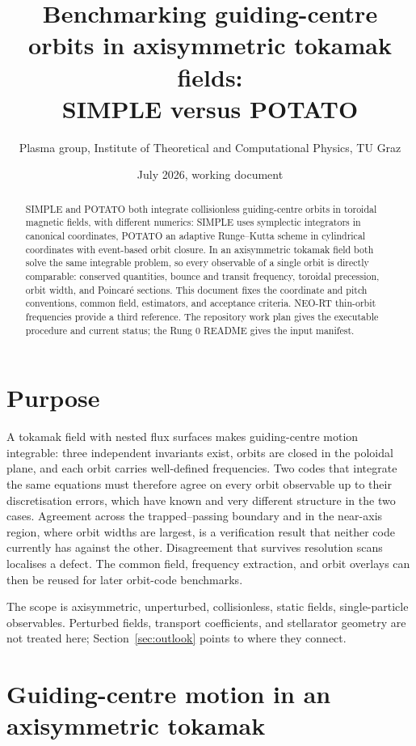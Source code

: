 \documentclass[11pt,a4paper]{article}
\title{Benchmarking guiding-centre orbits in axisymmetric tokamak fields:\\
SIMPLE versus POTATO}
\author{Plasma group, Institute of Theoretical and Computational Physics,
TU Graz}
\date{July 2026, working document}
\begin{document}
\maketitle

\begin{abstract}
SIMPLE and POTATO both integrate collisionless guiding-centre orbits in
toroidal magnetic fields, with different numerics: SIMPLE uses symplectic
integrators in canonical coordinates, POTATO an adaptive
Runge--Kutta scheme in cylindrical coordinates with event-based orbit closure.
In an axisymmetric tokamak field both solve the same integrable problem, so
every observable of a single orbit is directly comparable: conserved
quantities, bounce and transit frequency, toroidal precession, orbit width,
and Poincar\'e sections. This document fixes the coordinate and pitch
conventions, common field, estimators, and acceptance criteria. NEO-RT
thin-orbit frequencies provide a third reference. The repository work plan
gives the executable procedure and current status; the Rung 0 README gives the
input manifest.
\end{abstract}

\section{Purpose}

A tokamak field with nested flux surfaces makes guiding-centre motion
integrable: three independent invariants exist, orbits are closed in the
poloidal plane, and each orbit carries well-defined frequencies. Two codes
that integrate the same equations must therefore agree on every orbit
observable up to their discretisation errors, which have known and very
different structure in the two cases. Agreement across the trapped--passing
boundary and in the near-axis region, where orbit widths are largest, is a
verification result that neither code currently has against the other.
Disagreement that survives resolution scans localises a defect. The common
field, frequency extraction, and orbit overlays can then be reused for later
orbit-code benchmarks.

The scope is axisymmetric, unperturbed,
collisionless, static fields, single-particle observables. Perturbed fields,
transport coefficients, and stellarator geometry are not treated here;
Section~\ref{sec:outlook} points to where they connect.

\section{Guiding-centre motion in an axisymmetric tokamak}
\label{sec:theory}
\end{document}
